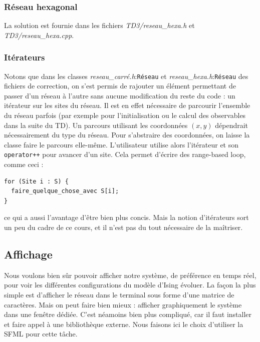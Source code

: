 \documentclass{book}
\newcommand{\inline}[1]{\texttt{#1}}
\def\filename{\emph}
\begin{document}
\begin{correction}
\subsubsection*{Réseau hexagonal}

La solution est fournie dans les fichiers \filename{TD3/reseau\_hexa.h} et \filename{TD3/reseau\_hexa.cpp}.

\subsubsection*{Itérateurs}

Notons que dans les classes \filename{reseau\_carré.h}:\inline{Réseau} et \filename{reseau\_hexa.h}:\inline{Réseau} des fichiers de correction, on s'est permis de rajouter un élément permettant de passer d'un réseau à l'autre sans aucune modification du reste du code : un itérateur sur les sites du réseau. Il est en effet nécessaire de parcourir l'ensemble du réseau parfois (par exemple pour l'initialisation ou le calcul des observables dans la suite du TD). Un parcours utilisant les coordonnées $(x,y)$ dépendrait nécessairement du type du réseau. Pour s'abstraire des coordonnées, on laisse la classe faire le parcours elle-même. L'utilisateur utilise alors l'itérateur et son \inline{operator++} pour avancer d'un site. Cela permet d'écrire des range-based loop, comme ceci :
\begin{verbatim}
for (Site i : S) {
  faire_quelque_chose_avec S[i];
}
\end{verbatim}
ce qui a aussi l'avantage d'être bien plus concis. Mais la notion d'itérateurs sort un peu du cadre de ce cours, et il n'est pas du tout nécessaire de la maîtriser.

\end{correction}

\subsection{Affichage}

Nous voulons bien sûr pouvoir afficher notre système, de préférence en temps réel, pour voir les différentes configurations du modèle d'Ising évoluer. La façon la plus simple est d'afficher le réseau dans le terminal sous forme d'une matrice de caractères. Mais on peut faire bien mieux : afficher graphiquement le système dans une fenêtre dédiée. C'est néamoins bien plus compliqué, car il faut installer et faire appel à une bibliothèque externe. Nous faisons ici le choix d'utiliser la SFML pour cette tâche.
\end{document}
